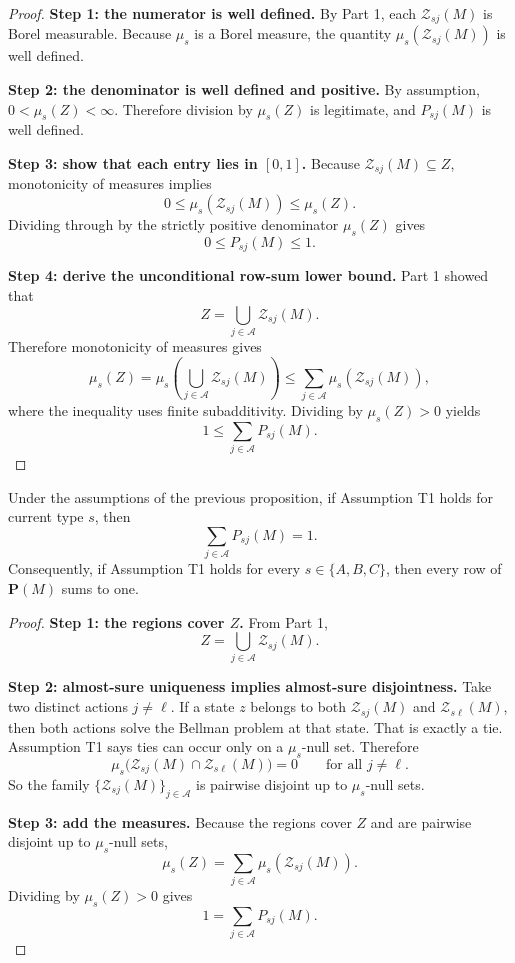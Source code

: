 \begin{proof}
\medskip\noindent\textbf{Step 1: the numerator is well defined.}
By Part 1, each $\mathcal Z_{sj}(M)$ is Borel measurable. Because $\mu_s$ is a Borel measure, the quantity $\mu_s(\mathcal Z_{sj}(M))$ is well defined.

\medskip\noindent\textbf{Step 2: the denominator is well defined and positive.}
By assumption, $0<\mu_s(Z)<\infty$. Therefore division by $\mu_s(Z)$ is legitimate, and $P_{sj}(M)$ is well defined.

\medskip\noindent\textbf{Step 3: show that each entry lies in $[0,1]$.}
Because $\mathcal Z_{sj}(M)\subseteq Z$, monotonicity of measures implies
\[
0\le \mu_s(\mathcal Z_{sj}(M))\le \mu_s(Z).
\]
Dividing through by the strictly positive denominator $\mu_s(Z)$ gives
\[
0\le P_{sj}(M)\le 1.
\]

\medskip\noindent\textbf{Step 4: derive the unconditional row-sum lower bound.}
Part 1 showed that
\[
Z=\bigcup_{j\in\mathcal A}\mathcal Z_{sj}(M).
\]
Therefore monotonicity of measures gives
\[
\mu_s(Z)
=
\mu_s\!\left(\bigcup_{j\in\mathcal A}\mathcal Z_{sj}(M)\right)
\le
\sum_{j\in\mathcal A}\mu_s(\mathcal Z_{sj}(M)),
\]
where the inequality uses finite subadditivity. Dividing by $\mu_s(Z)>0$ yields
\[
1\le \sum_{j\in\mathcal A}P_{sj}(M).
\]
\end{proof}

\begin{proposition}
Under the assumptions of the previous proposition, if Assumption T1 holds for current type $s$, then
\[
\sum_{j\in\mathcal A}P_{sj}(M)=1.
\]
Consequently, if Assumption T1 holds for every $s\in\{A,B,C\}$, then every row of $\mathbf P(M)$ sums to one.
\end{proposition}

\begin{proof}
\medskip\noindent\textbf{Step 1: the regions cover $Z$.}
From Part 1,
\[
Z=\bigcup_{j\in\mathcal A}\mathcal Z_{sj}(M).
\]

\medskip\noindent\textbf{Step 2: almost-sure uniqueness implies almost-sure disjointness.}
Take two distinct actions $j\neq \ell$. If a state $z$ belongs to both $\mathcal Z_{sj}(M)$ and $\mathcal Z_{s\ell}(M)$, then both actions solve the Bellman problem at that state. That is exactly a tie. Assumption T1 says ties can occur only on a $\mu_s$-null set. Therefore
\[
\mu_s\bigl(\mathcal Z_{sj}(M)\cap \mathcal Z_{s\ell}(M)\bigr)=0
\qquad\text{for all }j\neq \ell.
\]
So the family $\{\mathcal Z_{sj}(M)\}_{j\in\mathcal A}$ is pairwise disjoint up to $\mu_s$-null sets.

\medskip\noindent\textbf{Step 3: add the measures.}
Because the regions cover $Z$ and are pairwise disjoint up to $\mu_s$-null sets,
\[
\mu_s(Z)=\sum_{j\in\mathcal A}\mu_s(\mathcal Z_{sj}(M)).
\]
Dividing by $\mu_s(Z)>0$ gives
\[
1=\sum_{j\in\mathcal A}P_{sj}(M).
\]
\end{proof}

